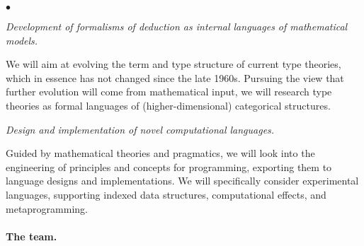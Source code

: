 \documentclass[11pt,twocolumn]{article}
\newenvironment{myitemize}
  {\begin{list}{$\bullet$}
  {\setlength{\topsep}{1pt}
   \setlength{\partopsep}{1pt}
   \setlength{\itemsep}{0pt}
   \setlength{\parsep}{0pt}
   \setlength{\leftmargin}{1em}
   \setlength{\labelwidth}{.5em}}}
  {\end{list}}
\begin{document}
\begin{myitemize}
\item[{\bfseries 3\enspace Calculi:}]\mbox{}\enspace\thinspace
  \emph{Development of formalisms of deduction as internal languages of
    mathematical models.}
  
  \vspace*{1mm}
  We will aim at evolving the term and type structure of current type
  theories, which in essence has not changed since the late 1960s.  Pursuing
  the view that further evolution will come from mathematical input, we will
  research type theories as formal languages of (higher-dimensional)
  categorical structures.  
  \vspace*{1mm}

\item[{\bfseries 4\enspace Programming:}]\mbox{}\enspace\thinspace
  \emph{Design and implementation of novel computational languages.}

  \vspace*{1mm}
  Guided by mathematical theories and pragmatics, we will look into the
  engineering of principles and concepts for programming, exporting them to
  language designs and implementations.  We will specifically consider
  experimental languages, supporting indexed data structures, computational
  effects, and metaprogramming.  
\end{myitemize}

\paragraph*{The team.}
\end{document}
